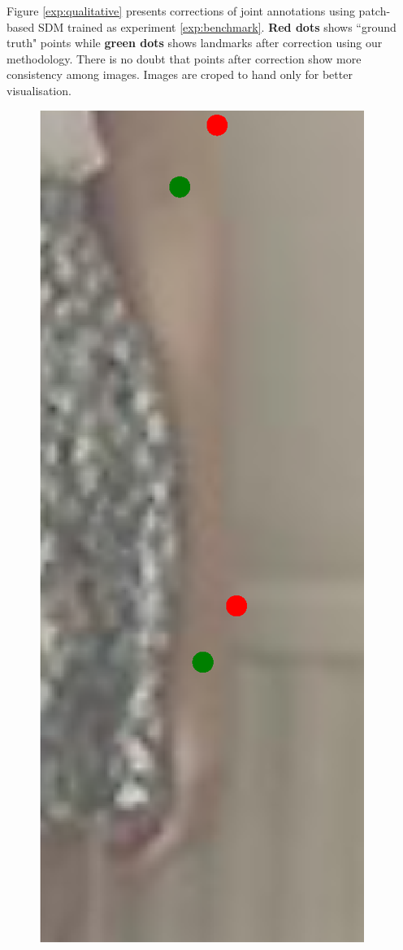 Figure \ref{exp:qualitative} presents corrections of joint annotations using patch-based SDM trained as experiment \ref{exp:benchmark}. \textbf{Red dots} shows ``ground truth" points while \textbf{green dots} shows landmarks after correction using our methodology. There is no doubt that points after correction show more consistency among images. Images are croped to hand only for better visualisation.

\begin{figure}[t!]
    \newcommand{\fh}{0.24\columnwidth}
    \centering
    \includegraphics[height=\fh]{resources/Fixing/fix_3}

\end{figure}
